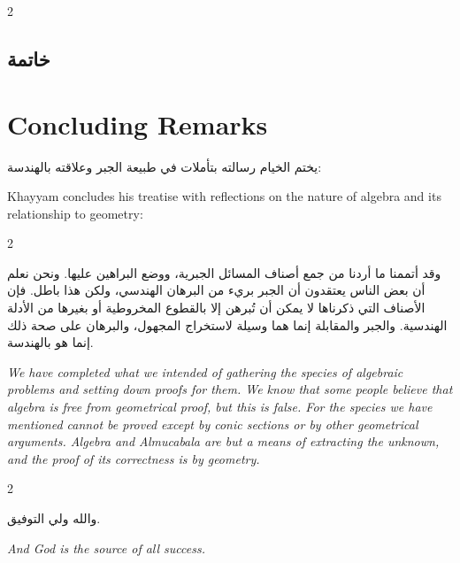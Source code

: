 \documentclass[11pt,a4paper]{book}
\begin{document}
\begin{paracol}{2}

\begin{Arabic}
\section*{خاتمة}
\end{Arabic}

\switchcolumn

\section*{Concluding Remarks}

\switchcolumn*

\begin{Arabic}
يختم الخيام رسالته بتأملات في طبيعة الجبر وعلاقته بالهندسة:
\end{Arabic}

\switchcolumn

Khayyam concludes his treatise with reflections on the nature of algebra and its relationship to geometry:

\end{paracol}

\begin{paracol}{2}

\begin{Arabic}
وقد أتممنا ما أردنا من جمع أصناف المسائل الجبرية، ووضع البراهين عليها. ونحن نعلم أن بعض الناس يعتقدون أن الجبر بريء من البرهان الهندسي، ولكن هذا باطل. فإن الأصناف التي ذكرناها لا يمكن أن تُبرهن إلا بالقطوع المخروطية أو بغيرها من الأدلة الهندسية. والجبر والمقابلة إنما هما وسيلة لاستخراج المجهول، والبرهان على صحة ذلك إنما هو بالهندسة.
\end{Arabic}

\switchcolumn

\textit{We have completed what we intended of gathering the species of algebraic problems and setting down proofs for them. We know that some people believe that algebra is free from geometrical proof, but this is false. For the species we have mentioned cannot be proved except by conic sections or by other geometrical arguments. Algebra and Almucabala are but a means of extracting the unknown, and the proof of its correctness is by geometry.}

\end{paracol}

\vspace{0.5cm}

\begin{paracol}{2}

\begin{Arabic}
والله ولي التوفيق.
\end{Arabic}

\switchcolumn

\textit{And God is the source of all success.}

\end{paracol}
\end{document}
